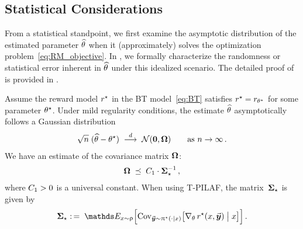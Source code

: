 		
		
		
		

\subsection{Statistical Considerations \yaqidone}
    \label{sec:theory_stat}

From a statistical standpoint, we first examine the asymptotic distribution of the estimated parameter $\widehat{\theta}$ when it (approximately) solves the optimization problem~\eqref{eq:RM_objective}. In , we formally characterize the randomness or statistical error inherent in $\widehat{\theta}$ under this idealized scenario.
The detailed proof of  is provided in .
\begin{theorem}
    \label{thm:asymp}
    Assume the reward model $r^{\star}$ in the BT model~\eqref{eq:BT} satisfies $r^{\star} = r_{\theta^{\star}}$ for some parameter $\theta^{\star}$.
    Under mild regularity conditions, the estimate $\widehat{\theta}$ asymptotically follows a Gaussian distribution
    \begin{align*}
        \sqrt{n} \; ( \widehat{\theta} - \theta^{\star})
        \; \stackrel{d}{\longrightarrow} \; \mathcal{N}( \boldsymbol{0}, \boldsymbol{\Omega} )
        \qquad \mbox{as $n \rightarrow \infty$} \, .
    \end{align*}
    We have an estimate of the covariance matrix $\boldsymbol{\Omega}$:
    \begin{align*}
        \boldsymbol{\Omega} \; \preceq \; C_{1} \cdot \boldsymbol{\Sigma}_{\star}^{-1} \, ,
    \end{align*}
    where $C_{1} > 0$ is a universal constant. 
    When using T-PILAF, the matrix~$\boldsymbol{\Sigma}_{\star}$ is given by
    \begin{align}
        \label{eq:def_CovOpstar_simple}
        \CovOpstar \defn \; \Exp_{\prompt \sim \promptdistr} \Big[ \Cov_{\response \sim \policystar(\cdot \mid \prompt)} \big[ \gradtheta \rewardstar(\prompt, \response) \bigm| \prompt \big] \Big] \, .
    \end{align}
\end{theorem}


